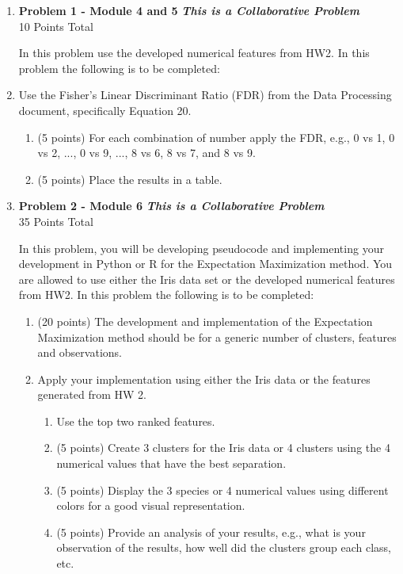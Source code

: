 \documentclass{article}
\begin{document}
\begin{enumerate}

    \item \textbf{Problem 1 - Module 4 and 5}  \textbf{\emph{This is a Collaborative Problem}}\\
    10 Points Total 

	In this problem use the developed numerical features from HW2. In this problem the following is to be completed:\\

		\item Use the Fisher's Linear Discriminant Ratio (FDR) from the Data Processing document, specifically Equation 20. 
		\begin{enumerate}
			\item (5 points) For each combination of number apply the FDR, e.g., 0 vs 1, 0 vs 2, ..., 0 vs 9, ..., 8 vs 6, 8 vs 7, and 8 vs 9.
			\item (5 points) Place the results in a table. 
		\end{enumerate}

    \vspace{5mm}

	\pagebreak

    \item \textbf{Problem 2 - Module 6}  \textbf{\emph{This is a Collaborative Problem}}\\
    35 Points Total 

	In this problem, you will be developing pseudocode and implementing your development in Python or R for the Expectation Maximization method. You are allowed to use either the Iris data set or the developed numerical features from HW2. In this problem the following is to be completed:\\

  	\begin{enumerate}
		\item (20 points) The development and implementation of the Expectation Maximization method should be for a generic number of clusters, features and observations.
		\item Apply your implementation using either the Iris data or the features generated from HW 2.
		\begin{enumerate}
			\item Use the top two ranked features.
			\item (5 points) Create 3 clusters for the Iris data or 4 clusters using the 4 numerical values that have the best separation.
			\item (5 points) Display the 3 species or 4 numerical values using different colors for a good visual representation.
			\item (5 points) Provide an analysis of your results, e.g., what is your observation of the results, how well did the clusters group each class, etc.
		\end{enumerate}
	\end{enumerate}


\end{enumerate}
\end{document}
